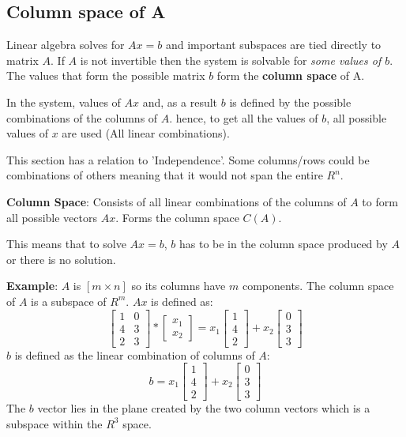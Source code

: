 \documentclass[10pt,a4paper]{article}
\begin{document}
\subsection{Column space of A}
Linear algebra solves for $Ax=b$ and important subspaces are tied directly to matrix $A$. If $A$ is
not invertible then the system is solvable for \textit{some values of $b$}. The values that form the
possible matrix $b$ form the \textbf{column space} of A. \par 
In the system, values of $Ax$ and, as a result $b$ is defined by the possible combinations of the
columns of $A$. hence, to get all the values of $b$, all possible values of $x$ are used (All linear
combinations). \par 
This section has a relation to 'Independence'. Some columns/rows could be combinations
of others meaning that it would not span the entire $R^n$.
\begin{tcolorbox}[breakable,colback=white,colframe=black,width=\dimexpr\textwidth+12mm\relax,enlarge left by=-6mm]
\textbf{Column Space}: Consists of all linear combinations of the columns of $A$ to form all possible vectors
$Ax$. Forms the column space $C(A)$.
\end{tcolorbox}
This means that to solve $Ax=b$, $b$ has to be in the column space produced by $A$ or there is no
solution. \par 
\textbf{Example}: $A$ is $[m\times n]$ so its columns have $m$ components. The column space of $A$ is a
subspace of $R^m$. $Ax$ is defined as: 
$$\begin{bmatrix}
	1 & 0\\ 
	4 & 3\\ 
	2 & 3
	\end{bmatrix} * \begin{bmatrix}
		x_1 \\ 
		x_2
		\end{bmatrix} = x_1\begin{bmatrix}
			1\\ 
			4\\ 
			2
			\end{bmatrix} + x_2\begin{bmatrix}
				0\\ 
				3\\ 
				3
				\end{bmatrix}  $$
$b$ is defined as the linear combination of columns of $A$:
$$b=x_1\begin{bmatrix}
	1\\ 
	4\\ 
	2
	\end{bmatrix} + x_2\begin{bmatrix}
		0\\ 
		3\\ 
		3
		\end{bmatrix} $$
		The $b$ vector lies in the plane created by the two column vectors which is a subspace
		within the $R^3$ space.
\end{document}
